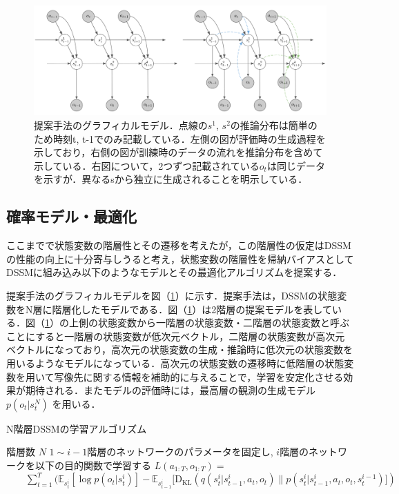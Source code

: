 \begin{figure}[tbp]
  \begin{center}
    \includegraphics[width=\linewidth]{./figures/proposal.png}
    \caption[提案手法のグラフィカルモデル]{提案手法のグラフィカルモデル．点線の$s^1$, $s^2$の推論分布は簡単のため時刻t, t-1でのみ記載している．左側の図が評価時の生成過程を示しており，右側の図が訓練時のデータの流れを推論分布を含めて示している．右図について，2つずつ記載されている$o_t$は同じデータを示すが．異なるsから独立に生成されることを明示している．}
    \label{fig:proposal}
  \end{center}
\end{figure}

\subsection{確率モデル・最適化}

ここまでで状態変数の階層性とその遷移を考えたが，この階層性の仮定はDSSMの性能の向上に十分寄与しうると考え，状態変数の階層性を帰納バイアスとしてDSSMに組み込み以下のようなモデルとその最適化アルゴリズムを提案する．

\vspace{\baselineskip}
提案手法のグラフィカルモデルを図（\ref{fig:proposal}）に示す．提案手法は，DSSMの状態変数をN層に階層化したモデルである．図（\ref{fig:proposal}）は2階層の提案モデルを表している．図（\ref{fig:proposal}）の上側の状態変数から一階層の状態変数・二階層の状態変数と呼ぶことにすると一階層の状態変数が低次元ベクトル，二階層の状態変数が高次元ベクトルになっており，高次元の状態変数の生成・推論時に低次元の状態変数を用いるようなモデルになっている．高次元の状態変数の遷移時に低階層の状態変数を用いて写像先に関する情報を補助的に与えることで，学習を安定化させる効果が期待される．またモデルの評価時には，最高層の観測の生成モデル $p(o_t|s^N_t)$ を用いる．

\begin{algorithm}[tbp]               
  \caption{N階層DSSMの学習アルゴリズム}
  \label{alg1}
  \begin{algorithmic}
    \REQUIRE 階層数 $N$ 
        \STATE $1 \sim i-1$階層のネットワークのパラメータを固定し, 
        \STATE $i$階層のネットワークを以下の目的関数で学習する
        \STATE $L(a_{1:T}, o_{1:T}) = $
        \STATE $ \hspace{2em}\sum_{t=1}^T ( \mathbb{E}_{s^i_t} [\log p(o_t|s^i_t)] - \mathbb{E}_{s^i_{t-1}} [\mathrm{D_{KL}}(q(s^i_t|s^i_{t-1}, a_t, o_t) \| p(s^i_t|s^i_{t-1}, a_t, o_t, s^{i-1}_t)]) $
      \ENDWHILE
    \ENDFOR
  \end{algorithmic}
\end{algorithm}

